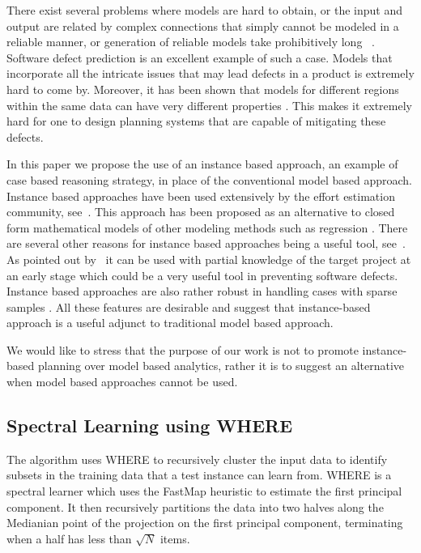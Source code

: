 \documentclass[conference]{IEEEtran}
\begin{document}
There exist several problems where models are hard to obtain, or the input and output are related by complex connections that simply cannot be modeled in a reliable manner, or generation of reliable models take prohibitively long ~\cite{Ludewig2003}. Software defect prediction is an excellent example of such a case. Models that incorporate all the intricate issues that may lead defects in a product is extremely hard to come by. Moreover, it has been shown that models for different regions within the same data can have very different properties \cite{localvsglobal}. This makes it extremely hard for one to design planning systems that are capable of mitigating these defects.

In this paper we propose the use of an instance based approach, an example of case based reasoning strategy, in place of the conventional model based approach. Instance based approaches have been used extensively by the effort estimation community, see~\cite{keung2008analogy, 6600685, walkerden1999empirical, shepperd1997estimating, kocaguneli2010use, some more form p1703 line 2}. This approach has been proposed as an alternative to closed form mathematical models of other modeling methods such as regression \cite{keung2008analogy}. There are several other reasons for instance based approaches being a useful tool, see~\cite{6600685}. As pointed out by~\cite{walkerden1999empirical} it can be used with partial knowledge of the target project at an early stage which could be a very useful tool in preventing software defects. Instance based approaches are also rather robust in handling cases with sparse samples \cite{1438374}. All these features are desirable and suggest that instance-based approach is a useful adjunct to traditional model based approach. 

We would like to stress that the purpose of our work is not to promote instance-based planning over model based analytics, rather it is to suggest an alternative when model based approaches cannot be used.

\subsection{Spectral Learning using WHERE}
The algorithm uses WHERE to recursively cluster the input data to identify subsets in the training data that a test instance can learn from. WHERE is a spectral learner which uses the FastMap heuristic to estimate the first principal component. It then recursively partitions the data into two halves along the Medianian point of the projection on the first principal component, terminating when a half has less than $\sqrt{N}$ items.   
\end{document}
